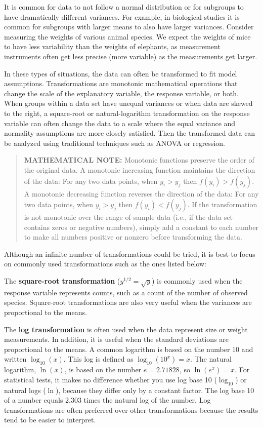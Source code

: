 \documentclass[
]{report}
\begin{document}
It is common for data to not follow a normal distribution or for subgroups to have dramatically different variances. For example, in biological studies it is common for subgroups with larger means to also have larger variances. Consider measuring the weights of various animal species. We expect the weights of mice to have less variability than the weights of elephants, as measurement instruments often get less precise (more variable) as the measurements get larger.

In these types of situations, the data can often be transformed to fit model assumptions. Transformations are monotonic mathematical operations that change the scale of the explanatory variable, the response variable, or both. When groups within a data set have unequal variances or when data are skewed to the right, a square-root or natural-logarithm transformation on the response variable can often change the data to a scale where the equal variance and normality assumptions are more closely satisfied. Then the transformed data can be analyzed using traditional techniques such as ANOVA or regression.

\begin{quote}
\textbf{MATHEMATICAL NOTE:} Monotonic functions preserve the order of the original data. A monotonic increasing function maintains the direction of the data: For any two data points, when \(\scriptstyle y_i > y_j\) then \(\scriptstyle f(y_i) > f(y_j)\). A monotonic decreasing function reverses the direction of the data: For any two data points, when \(\scriptstyle y_i > y_j\) then \(\scriptstyle f(y_i) < f(y_j)\). If the transformation is not monotonic over the range of sample data (i.e., if the data set contains zeros or negative numbers), simply add a constant to each number to make all numbers positive or nonzero before transforming the data.
\end{quote}

Although an infinite number of transformations could be tried, it is best to focus on commonly used transformations such as the ones listed below:

The \textbf{square-root transformation} (\(\scriptstyle y^{1/2} = \sqrt{y}\)) is commonly used when the response variable represents counts, such as a count of the number of observed species. Square-root transformations are also very useful when the variances are proportional to the means.

The \textbf{log transformation} is often used when the data represent size or weight measurements. In addition, it is useful when the standard deviations are proportional to the means. A common logarithm is based on the number 10 and written \(\scriptstyle \log_{10}(x)\). This log is defined as \(\scriptstyle \log_{10}(10^x) = x\). The natural logarithm, \(\scriptstyle \ln(x)\), is based on the number \(\scriptstyle e = 2.71828\), so \(\scriptstyle \ln(e^x) = x\). For statistical tests, it makes no difference whether you use log base 10 (\(\scriptstyle \log_{10}\)) or natural logs (\(\scriptstyle \ln\)), because they differ only by a constant factor. The log base 10 of a number equals 2.303 times the natural log of the number. Log transformations are often preferred over other transformations because the results tend to be easier to interpret.
\end{document}
